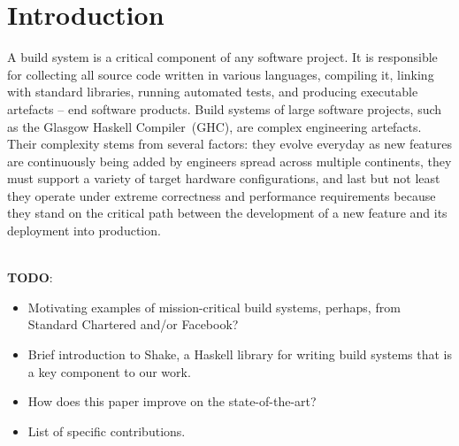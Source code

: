 \section{Introduction}

A build system is a critical component of any software project.
It is responsible for collecting all source code written in various languages,
compiling it, linking with standard libraries, running automated tests, and
producing executable artefacts -- end software products. Build systems of large
software projects, such as the Glasgow Haskell Compiler~(GHC), are complex
engineering artefacts. Their complexity stems from several factors: they evolve everyday as
new features are continuously being added by engineers spread across multiple
continents, they must support a variety of target hardware configurations, and
last but not least they operate under extreme correctness and performance
requirements because they stand on the critical path between the development of
a new feature and its deployment into production. 

~\\
\textbf{TODO}:
\begin{itemize}
  \item Motivating examples of mission-critical build systems, perhaps, from
  Standard Chartered and/or Facebook?
  \item Brief introduction to Shake, a Haskell library for writing build systems
  that is a key component to our work.
  \item How does this paper improve on the state-of-the-art?
  \item List of specific contributions.
\end{itemize}
